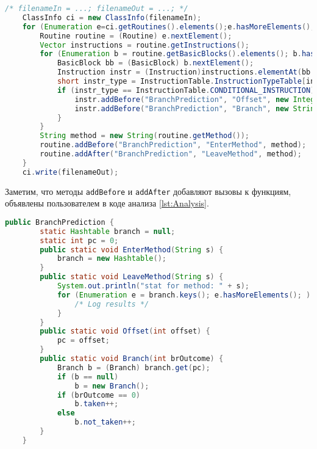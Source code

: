 \begin{lstlisting}[language=Java, caption=Подсчет условных переходов на \texttt{BIT}. Код инструментации, label=lst:Instrumentation]
    /* filenameIn = ...; filenameOut = ...; */
    ClassInfo ci = new ClassInfo(filenameIn);
    for (Enumeration e=ci.getRoutines().elements();e.hasMoreElements(); ){
        Routine routine = (Routine) e.nextElement();
        Vector instructions = routine.getInstructions();
        for (Enumeration b = routine.getBasicBlocks().elements(); b.hasMoreElements(); ) {
            BasicBlock bb = (BasicBlock) b.nextElement();
            Instruction instr = (Instruction)instructions.elementAt(bb.getEndAddress());
            short instr_type = InstructionTable.InstructionTypeTable[instr.getOpcode()];
            if (instr_type == InstructionTable.CONDITIONAL_INSTRUCTION) {
                instr.addBefore("BranchPrediction", "Offset", new Integer(instr.getOrigOffset()));
                instr.addBefore("BranchPrediction", "Branch", new String("BranchOutcome"));
            }
        }
        String method = new String(routine.getMethod());
        routine.addBefore("BranchPrediction", "EnterMethod", method);
        routine.addAfter("BranchPrediction", "LeaveMethod", method);
    }
    ci.write(filenameOut);
\end{lstlisting}

Заметим, что методы \texttt{addBefore} и \texttt{addAfter} добавляют вызовы к функциям, объявлены пользователем в коде анализа \autoref{lst:Analysis}.

\begin{lstlisting}[language=Java, caption=Подсчет условных переходов на \texttt{BIT}. Код анализа, label=lst:Analysis]
    public BranchPrediction {
        static Hashtable branch = null;
        static int pc = 0;
        public static void EnterMethod(String s) {
            branch = new Hashtable();
        }
        public static void LeaveMethod(String s) {
            System.out.println("stat for method: " + s);
            for (Enumeration e = branch.keys(); e.hasMoreElements(); ) {
                /* Log results */
            }
        }
        public static void Offset(int offset) {
            pc = offset;
        }
        public static void Branch(int brOutcome) {
            Branch b = (Branch) branch.get(pc);
            if (b == null)
                b = new Branch();
            if (brOutcome == 0)
                b.taken++;
            else
                b.not_taken++;
        }
    }
\end{lstlisting}

